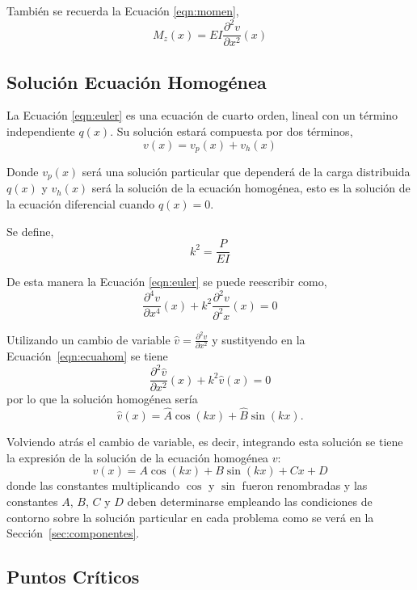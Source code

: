 También se recuerda la Ecuación \eqref{eqn:momen},  
\begin{equation}\label{eqn:condmomento}
M_z (x) = E I \frac{\partial^2 v}{\partial x^2}(x)
\end{equation}

\subsection{Solución Ecuación Homogénea}

La Ecuación \eqref{eqn:euler} es una ecuación de cuarto orden, lineal con un término independiente $q(x)$. Su solución estará compuesta por dos términos,
\begin{equation}
v(x)= v_p(x) + v_h(x)
\end{equation}

Donde $v_p(x)$ será una solución particular que dependerá de la carga distribuida $q(x)$ y $v_h(x)$ será la solución de la ecuación homogénea, esto es la solución de la ecuación diferencial cuando $q(x)=0$.

Se define,
\begin{equation}\label{eqn:defk}
k^2=\frac{P}{EI}
\end{equation}

De esta manera la Ecuación \eqref{eqn:euler} se puede reescribir como,
\begin{equation}\label{eqn:ecuahom}
\frac{\partial^4 v}{\partial x^4}(x) + k^2 \frac{\partial^2 v}{\partial^2 x}(x) = 0
\end{equation}

Utilizando un cambio de variable $\hat{v}=\frac{\partial^2 v}{\partial x^2}$ y sustityendo en la Ecuación~\eqref{eqn:ecuahom} se tiene
$$
\frac{\partial^2 \hat{v}}{\partial x^2}(x) + k^2 \hat{v}(x) = 0
$$
por lo que la solución homogénea sería
$$
\hat{v}(x) = \hat{A} \cos (kx) + \hat{B} \sin (kx).
$$

Volviendo atrás el cambio de variable, es decir, integrando esta solución se tiene la expresión de la solución de la ecuación homogénea $v$:
%
\begin{equation}
v(x) = A \cos (kx) + B \sin (kx) + Cx + D
\end{equation}
%
donde las constantes multiplicando $\cos$ y $\sin$ fueron renombradas y las constantes $A$, $B$, $C$ y $D$ deben determinarse empleando las condiciones de contorno sobre la solución particular en cada problema como se verá en la Sección~\ref{sec:componentes}.


\subsection{Puntos Críticos}

